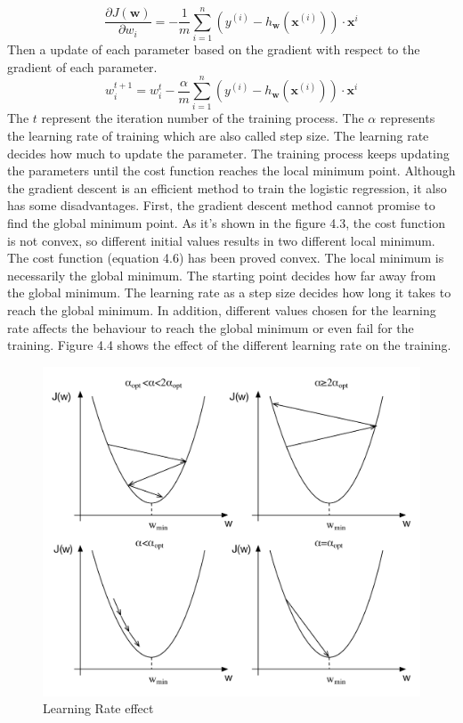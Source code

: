 \begin{equation}
\frac{\partial J(\textbf{w})}{\partial w_i} = - \frac{1}{m} \sum_{i=1}^n (y^{(i)}-h_{\textbf{w}} (\textbf{x}^{(i)})) \cdot \textbf{x}^{i}
\end{equation}
Then a update of each parameter based on the gradient with respect to the gradient of each parameter.
\begin{equation}
w_i^{t+1}= w_i^{t} - \frac{\alpha}{m} \sum_{i=1}^n (y^{(i)}-h_{\textbf{w}} (\textbf{x}^{(i)})) \cdot \textbf{x}^{i}
\end{equation}
The $t$ represent the iteration number of the training process. The $\alpha$ represents the learning rate of training which are also called step size. The learning rate decides how much to update the parameter. The training process  keeps updating the parameters until the cost function reaches the local minimum point.  Although the gradient descent is an efficient method to train the logistic regression, it also has some disadvantages. First, the gradient descent method cannot promise to find the global minimum point. As it's shown in the figure 4.3, the cost function is not convex, so different initial values results in two different local minimum. The cost function (equation 4.6) has been proved convex. The local minimum is necessarily the global minimum. The starting point decides how far away from the global minimum. The learning rate as a step size decides how long it takes to reach the global minimum. In addition, different values chosen for the learning rate  affects the behaviour to reach the global minimum or even fail for the training. Figure 4.4 shows the effect of the different learning rate on the training.
\begin{figure}
\centering
\includegraphics[scale=0.6]{learningRate.pdf}
\caption{Learning Rate effect}
\end{figure}

